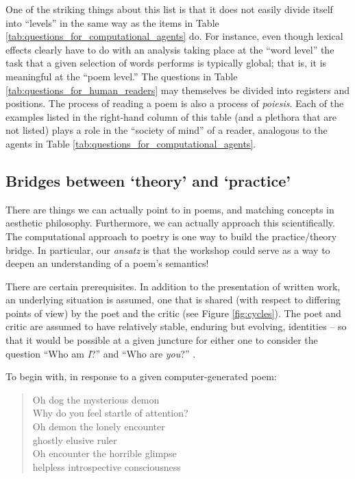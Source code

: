One of the striking things about this list is that it does not easily
divide itself into ``levels'' in the same way as the items in Table
\ref{tab:questions_for_computational_agents} do.  For instance, even
though lexical effects clearly have to do with an analysis taking
place at the ``word level'' the task that a given selection of words
performs is typically global; that is, it is meaningful at the ``poem
level.''  The questions in Table \ref{tab:questions_for_human_readers}
may themselves be divided into registers and positions.  The process
of reading a poem is also a process of \emph{poiesis}.  Each of the
examples listed in the right-hand column of this table (and a plethora
that are not listed) plays a role in the ``society of mind'' of a
reader, analogous to the agents in Table
\ref{tab:questions_for_computational_agents}.

\subsection{Bridges between `theory' and `practice'}

There are things we can actually point to in poems, and matching
concepts in aesthetic philosophy.  Furthermore, we can actually
approach this scientifically.  The computational approach to poetry is
one way to build the practice/theory bridge.  In particular, our
\emph{ansatz} is that the workshop could serve as a way to deepen an
understanding of a poem's semantics!

There are certain prerequisites.  In addition to the presentation of
written work, an underlying situation is assumed, one that is shared
(with respect to differing points of view) by the poet and the critic
(see Figure \ref{fig:cycles}).  The poet and critic are assumed to
have relatively stable, enduring but evolving, identities -- so that
it would be possible at a given juncture for either one to consider
the question ``Who am \emph{I}?''  and ``Who are \emph{you}?''
\cite[p. 251]{bakhtin1984problems}.

To begin with, in response to a given computer-generated poem:

{\itshape
\begin{verse}
%
Oh dog the mysterious demon\\
Why do you feel startle of attention?\\
Oh demon the lonely encounter\\
ghostly elusive ruler\\
Oh encounter the horrible glimpse\\
helpless introspective consciousness\\
\end{verse}
}

